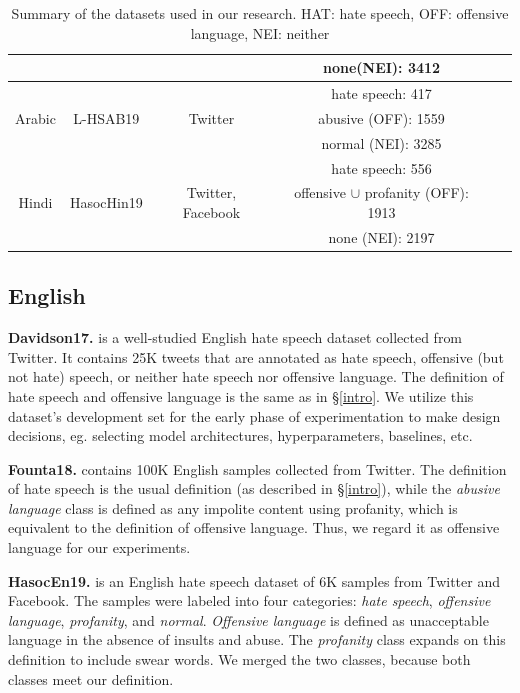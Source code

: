 \documentclass[11pt]{article}
\begin{document}
\begin{table}[ht!]
{\begin{tabular}{|c|c|c|c|c|}
				\cline{4-4}
				~ & ~ & ~ & none(NEI): 3412 & ~ \\
				\hline
				\multirow{3}{*}{Arabic} & \multirow{3}{*}{L-HSAB19} & \multirow{3}{*}{Twitter} & hate speech: 417 &  \multirow{3}{*}{\citealt{mulki-etal-2019-l}} \\
				\cline{4-4}
				~& ~ & ~ & abusive (OFF): 1559 & ~ \\
				\cline{4-4}
				~ & ~ & ~ & normal (NEI): 3285 & ~ \\
				\hline
				\multirow{3}{*}{Hindi} & \multirow{3}{*}{HasocHin19} & \multirow{3}{*}{Twitter, Facebook} & hate speech: 556 &  \multirow{3}{*}{\citealt{mandl2019overview}} \\
				\cline{4-4}
				~& ~ & ~ & offensive $\cup$ profanity (OFF): 1913 & ~ \\
				\cline{4-4}
				~ & ~ & ~ & none (NEI): 2197 & ~ \\
				\hline
		\end{tabular}}
		\caption{Summary of the datasets used in our research. HAT: hate speech, OFF: offensive language, NEI: neither}
		\label{data_summary}
	\end{table}
	
	
	\subsection{English}
	\textbf{Davidson17.} \citet{davidson} is a well-studied English hate speech dataset collected from Twitter. It contains 25K tweets that are annotated as hate speech, offensive (but not hate) speech, or neither hate speech nor offensive language. The definition of hate speech and offensive language is the same as in \S\ref{intro}. We utilize this dataset's development set for the early phase of experimentation to make design decisions, eg. selecting model architectures, hyperparameters, baselines, etc.
	
	\textbf{Founta18.} \citet{founta} contains 100K English samples collected from Twitter. The definition of hate speech is the usual definition (as described in \S\ref{intro}), while the \textit{abusive language} class is defined as any impolite content using profanity, which is equivalent to the definition of offensive language. Thus, we regard it as offensive language for our experiments.
	
	\textbf{HasocEn19.} \citet{mandl2019overview} is an English hate speech dataset of 6K samples from Twitter and Facebook. The samples were labeled into four categories: \textit{hate speech}, \textit{offensive language}, \textit{profanity}, and \textit{normal}. \textit{Offensive language} is defined as unacceptable language in the absence of insults and abuse. The \textit{profanity} class expands on this definition to include swear words. We merged the two classes, because both classes meet our definition.
	
\end{document}
